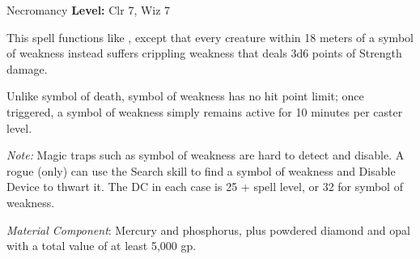 {Necromancy}
{
	\textbf{Level:}
	Clr 7, Wiz 7\\
}
{
	This spell functions like , except that every creature within 18 meters of a symbol of weakness instead suffers crippling weakness that deals 3d6 points of Strength damage.

	Unlike symbol of death, symbol of weakness has no hit point limit; once triggered, a symbol of weakness simply remains active for 10 minutes per caster level.

	\textit{Note:} Magic traps such as symbol of weakness are hard to detect and disable. A rogue (only) can use the Search skill to find a symbol of weakness and Disable Device to thwart it. The DC in each case is 25 + spell level, or 32 for symbol of weakness.

	\textit{Material Component}:
	Mercury and phosphorus, plus powdered diamond and opal with a total value of at least 5,000 gp.

}
